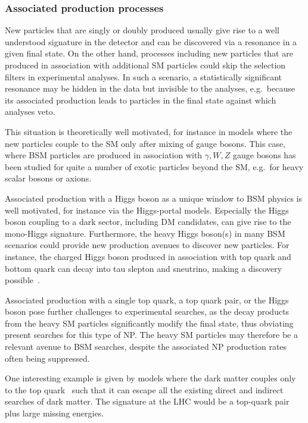 \documentclass[10pt]{article}
\begin{document}
\subsubsection{Associated production processes}
%
New particles that are singly or doubly produced usually give rise to a well understood signature in the detector and can be discovered via a resonance in a given final state.
On the other hand, processes including new particles that are produced in association with additional SM particles could skip the selection filters in experimental analyses.
In such a scenario, a statistically significant resonance may be hidden in the data but invisible to the analyses, e.g.\ because its associated production leads to particles in the final state against which analyses veto.

This situation is theoretically well motivated, for instance in models where the new particles couple to the SM only after mixing of gauge bosons.
This case, where BSM particles are produced in association with $\gamma, W, Z$ gauge bosons has been studied for quite a number of exotic particles beyond the SM, e.g.\ for heavy scalar bosons or axions. 

Associated production with a Higgs boson as a unique window to BSM physics is well motivated, for instance via the Higgs-portal models. Especially the Higgs boson coupling to a dark sector, including DM candidates, can give rise to the mono-Higgs signature.
% 
Furthermore, the heavy Higgs boson(s) in many BSM scenarios could provide new production avenues to discover new particles. For instance, the charged Higgs boson produced in association with top quark and bottom quark can decay into tau slepton and sneutrino, making a discovery possible~\cite{Gori:2018pmk}. 

Associated production with a single top quark, a top quark pair, or the Higgs boson pose further challenges to experimental searches, as the decay products from the heavy SM particles significantly modify the final state, thus obviating present searches for this type of NP.
The heavy SM particles may therefore be a relevant avenue to BSM searches, despite the associated NP production rates often being suppressed. 

One interesting example is given by models where the dark matter couples only to the top quark~\cite{Cheung:2010zf,Haisch:2015ioa} such that it can escape all the existing direct and indirect searches of dark matter. The signature at the LHC would be a top-quark pair plus large missing energies.
\end{document}
